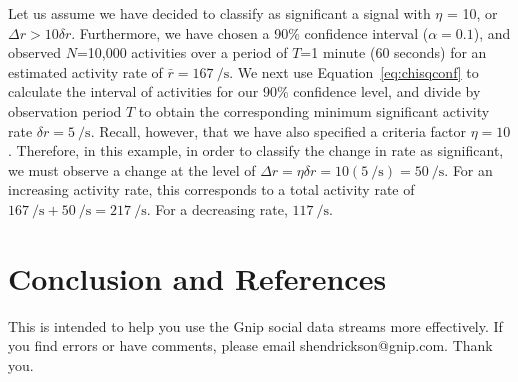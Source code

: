 \documentclass{article}
\begin{document}
%
%


Let us assume we have decided to classify as significant a signal with $\eta$ = 10, or 
$\Delta r > 10\delta r$. Furthermore, we have chosen a 90\% confidence interval 
($\alpha = 0.1$), and observed $N$=10,000 activities over a period of $T$=1 minute 
(60 seconds) for an estimated activity rate of $\bar r = 167~\si{\per\second}$. We next use 
Equation~\ref{eq:chisqconf} to calculate the interval of activities for our 
90\% confidence level, and divide by observation period $T$ to obtain the corresponding 
minimum significant activity rate $\delta r = 5~\si{\per\second}$. Recall, however, 
that we have also specified a criteria factor $\eta = 10$. Therefore, in this example, 
in order to classify the change in rate as significant, we must observe a change at the 
level of 
$\Delta r = \eta \delta r = 10 (5~\si{\per\second}) = 50~\si{\per\second}$. 
For an increasing activity rate, this corresponds to a total activity rate of 
$167~\si{\per\second} + 50~\si{\per\second} = 217~\si{\per\second}$. For a decreasing 
rate, $117~\si{\per\second}$.






\section{Conclusion and References} 

This is intended to help you use the Gnip social data streams more effectively.  If you find errors or have comments, please email shendrickson@gnip.com. Thank you.
\end{document}

